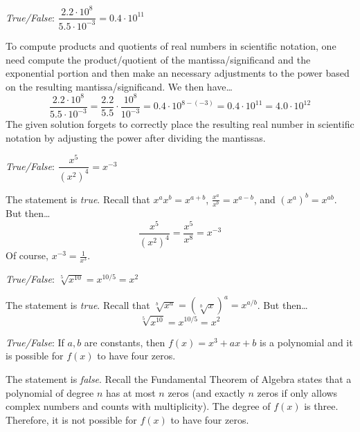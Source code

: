 \documentclass[11pt,letterpaper]{article}
\begin{document}
\quizsol \textit{True/False}: $\dfrac{2.2 \cdot 10^8}{5.5 \cdot 10^{-3}}= 0.4 \cdot 10^{11}$ \pspace

\sol To compute products and quotients of real numbers in scientific notation, one need compute the product/quotient of the mantissa/significand and the exponential portion and then make an necessary adjustments to the power based on the resulting mantissa/significand. We then have\dots
	\[
	\dfrac{2.2 \cdot 10^8}{5.5 \cdot 10^{-3}}= \dfrac{2.2}{5.5} \cdot \dfrac{10^8}{10^{-3}}= 0.4 \cdot 10^{8 - (-3)}= 0.4 \cdot 10^{11}= 4.0 \cdot 10^{12}
	\] 
The given solution forgets to correctly place the resulting real number in scientific notation by adjusting the power after dividing the mantissas. \pvspace{1.3cm}



\quizsol \textit{True/False}: $\dfrac{x^5}{(x^2)^4}= x^{-3}$ \pspace

\sol The statement is \textit{true}. Recall that $x^a x^b= x^{a+b}$, $\frac{x^a}{x^b}= x^{a-b}$, and $(x^a)^b= x^{ab}$. But then\dots
	\[
	\dfrac{x^5}{(x^2)^4}= \dfrac{x^5}{x^8}= x^{-3}
	\]
Of course, $x^{-3}= \frac{1}{x^3}$. \pvspace{1.3cm}



\quizsol \textit{True/False}: $\sqrt[5]{x^{10}}= x^{10/5}= x^2$ \pspace

\sol The statement is \textit{true}. Recall that $\sqrt[b]{x^a}= \left( \sqrt[b]{x} \right)^a= x^{a/b}$. But then\dots
	\[
	\sqrt[5]{x^{10}}= x^{10/5}= x^2
	\] \pvspace{1.3cm}



\quizsol \textit{True/False}: If $a, b$ are constants, then $f(x)= x^3 + ax + b$ is a polynomial and it is possible for $f(x)$ to have four zeros. \pspace

\sol The statement is \textit{false}. Recall the Fundamental Theorem of Algebra states that a polynomial of degree $n$ has at most $n$ zeros (and exactly $n$ zeros if only allows complex numbers and counts with multiplicity). The degree of $f(x)$ is three. Therefore, it is not possible for $f(x)$ to have four zeros. 





\end{document}

